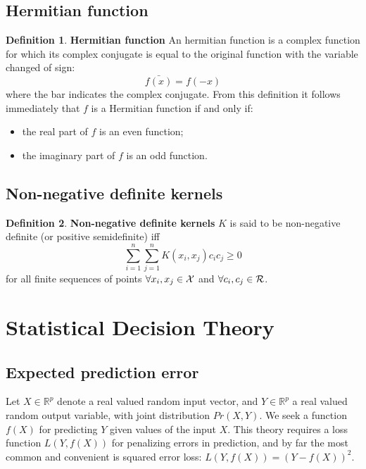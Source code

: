 \documentclass[12pt, letterpaper]{article}
\theoremstyle{definition}
\newtheorem{definition}{Definition}[section]
\newcommand{\R}{\mathbb{R}}
\let\tb\textbf
\begin{document}
\subsection{Hermitian function}
\begin{definition}{\tb{Hermitian function}}
\label{Hermitian}
An hermitian function is a complex function for which its complex conjugate is equal to the original function with the variable changed of sign:
\begin{equation}
\bar{f(x)} = f(-x)
\end{equation}
where the bar indicates the complex conjugate.
From this definition it follows immediately that $f$ is a Hermitian function if and only if:
\begin{itemize}
\item the real part of $f$ is an even function;
\item the imaginary part of $f$ is an odd function.
\end{itemize}
\end{definition}

\subsection{Non-negative definite kernels}
\begin{definition}{\tb{Non-negative definite kernels}}
$K$ is said to be non-negative definite (or positive semidefinite) iff
\begin{equation}
\sum _{i=1}^{n}\sum _{j=1}^{n}K(x_{i},x_{j})c_{i}c_{j}\geq 0
\end{equation}
for all finite sequences of points $\forall x_i,x_j \in \CMcal{X}$ and $\forall c_i, c_j \in \CMcal{R}$.
\end{definition}
\newpage
\section{Statistical Decision Theory}
\subsection{Expected prediction error}
Let $X \in \R^p$ denote a real valued random input vector, and $Y \in \R^p$ a real valued random output variable, with joint distribution $Pr(X,Y)$. We seek a function $f(X)$ for predicting $Y$ given values of the input $X$. This theory requires a loss function $L(Y,f(X))$ for penalizing errors in prediction, and by far the most common and convenient is 
squared error loss: $L(Y,f(X))=(Y -f(X))^2$.
\end{document}

